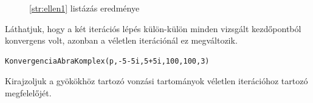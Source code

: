 \documentclass[a4paper,12pt]{report}
\begin{document}
                \begin{figure}[ht]
					\centering
			        \caption{\ref{str:ellen1} listázás eredménye}
				\end{figure}
				
                Láthatjuk, hogy a két iterációs lépés külön-külön minden vizsgált kezdőpontból konvergens volt, azonban a véletlen iterációnál ez megváltozik.
                \begin{lstlisting}[caption=Bemenet,label=lst:ellen2]
KonvergenciaAbraKomplex(p,-5-5i,5+5i,100,100,3)
                \end{lstlisting}
                Kirajzoljuk a gyökökhöz tartozó vonzási tartományok véletlen iterációhoz tartozó megfelelőjét.
                
\end{document}
